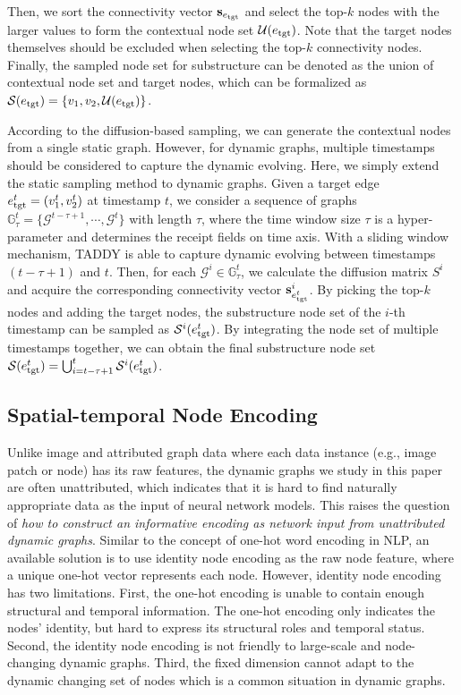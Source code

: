 \documentclass[10pt,journal,compsoc]{IEEEtran}
\newcommand{\HL}{}
\begin{document}
\noindent Then, we sort the connectivity vector $\mathbf{s}_{e_{\rm tgt}}$ and select the top-$k$ nodes with the larger values to form the contextual node set $\mathcal{U}(e_{\rm tgt})$. Note that the target nodes themselves should be excluded when selecting the top-$k$ connectivity nodes. Finally, the sampled node set for substructure can be denoted as the union of contextual node set and target nodes, which can be formalized as $\mathcal{S}(e_{\rm tgt}) = \{v_1,v_2,\mathcal{U}(e_{\rm tgt})\}$.

According to the diffusion-based sampling, we can generate the contextual nodes from a \HL{single} static graph. However, for dynamic graphs, multiple timestamps should be considered to capture the dynamic evolving. \HL{Here}, we simply extend the static sampling method to dynamic graphs. \HL{Given} a target edge $e_{\rm tgt}^t = (v_1^t,v_2^t)$ at timestamp $t$, \HL{we consider a sequence of graphs $\mathbb{G}^t_\tau = \{\mathcal{G}^{t-\tau+1}, \cdots, \mathcal{G}^{t} \}$ with length $\tau$, where the time window size $\tau$ is a hyper-parameter and determines the receipt fields on time axis. With a sliding window mechanism, TADDY is able to capture dynamic evolving between timestamps $(t-\tau+1)$ and $t$. Then,} for each $\mathcal{G}^i \in \mathbb{G}^t_\tau$, we calculate the diffusion matrix $S^i$ and acquire the corresponding connectivity vector $\mathbf{s}^i_{e_{\rm tgt}^t}$. By picking the top-$k$ nodes and adding the target nodes, the substructure node set of the $i$-th timestamp can be sampled as $\mathcal{S}^i(e^t_{\rm tgt})$. By integrating the node set of multiple timestamps together, we can obtain the final substructure node set $\mathcal{S}(e_{\rm tgt}^t) = \bigcup_{i={t-\tau+1}}^{t}  \mathcal{S}^i(e_{\rm tgt}^t)$.


\subsection{Spatial-temporal Node Encoding} \label{subsec:encoding}

Unlike image and attributed graph data where each data instance (e.g., image patch or node) has its raw features, the dynamic graphs we study in this paper are often unattributed, which indicates that it is hard to find naturally appropriate data as the input of neural network models. This raises the question of \textit{how to construct an informative encoding as network input from unattributed dynamic graphs}. Similar to the concept of one-hot word encoding in NLP, an available solution is to use identity node encoding as the raw node feature, where a unique one-hot vector represents each node. However, identity node encoding has two limitations. First, the one-hot encoding is unable to contain enough structural and temporal information. The one-hot encoding only indicates the nodes' identity, but hard to express its structural roles and temporal status. Second, the identity node encoding is not friendly to large-scale and node-changing dynamic graphs. 
\HL{Third}, the fixed dimension cannot adapt to the dynamic changing set of nodes which is a common situation in dynamic graphs.
\end{document}
